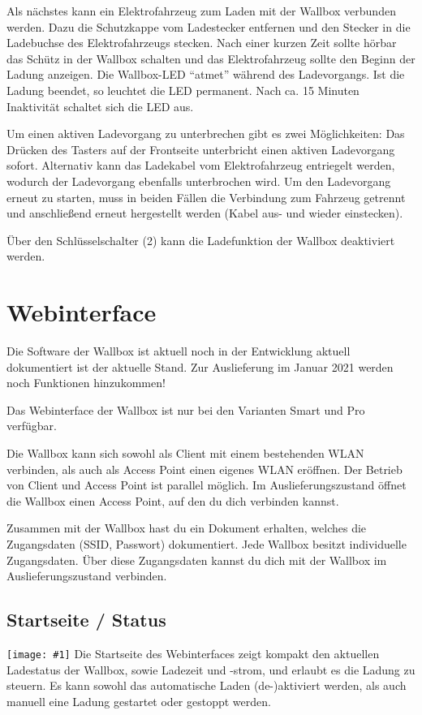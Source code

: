 \documentclass[a4paper,10pt]{article}
\newcommand{\hint}[1]{\begin{tcolorbox}[colback=boxgray,colframe=black,coltext=
white,title=Hinweis]#1\end{tcolorbox}}
\newcommand{\gfx}[1]{\texttt{[image: \#1]}}
\begin{document}
\begin{multicols*}{2}
	Als nächstes kann ein Elektrofahrzeug zum Laden mit der Wallbox verbunden
	werden. Dazu die Schutzkappe vom Ladestecker entfernen und den Stecker in die
	Ladebuchse des Elektrofahrzeugs stecken. Nach einer kurzen Zeit sollte hörbar
	das Schütz in der Wallbox schalten und das Elektrofahrzeug sollte den Beginn
	der Ladung anzeigen. Die Wallbox-LED \enquote{atmet} während des
	Ladevorgangs. Ist die Ladung beendet, so leuchtet die LED permanent. Nach ca.
	15 Minuten Inaktivität schaltet sich die LED aus.

	Um einen aktiven Ladevorgang zu unterbrechen gibt es zwei Möglichkeiten: Das
	Drücken des Tasters auf der Frontseite unterbricht einen aktiven Ladevorgang
	sofort. Alternativ kann das Ladekabel vom Elektrofahrzeug entriegelt werden,
	wodurch der Ladevorgang ebenfalls unterbrochen wird. Um den Ladevorgang erneut
	zu starten, muss in beiden Fällen die Verbindung zum Fahrzeug getrennt und
	anschließend erneut hergestellt werden (Kabel aus- und wieder einstecken).

	Über den Schlüsselschalter (2) kann die Ladefunktion der Wallbox deaktiviert
	werden.

	\section{Webinterface}
	\hint{Die Software der Wallbox ist aktuell noch in der Entwicklung aktuell
		dokumentiert ist der aktuelle Stand. Zur Auslieferung im Januar 2021 werden
		noch Funktionen hinzukommen!}
	Das Webinterface der Wallbox ist nur bei den Varianten Smart und Pro verfügbar.

	Die Wallbox kann sich sowohl als Client mit einem bestehenden WLAN verbinden,
	als auch als Access Point einen eigenes WLAN eröffnen. Der Betrieb von Client
	und Access Point ist parallel möglich. Im Auslieferungszustand öffnet die
	Wallbox einen Access Point, auf den du dich verbinden kannst.

	Zusammen mit der Wallbox hast du ein Dokument erhalten, welches die
	Zugangsdaten (SSID, Passwort) dokumentiert. Jede Wallbox besitzt individuelle
	Zugangsdaten.  Über diese Zugangsdaten kannst du dich mit der Wallbox im
	Auslieferungszustand verbinden.

	\subsection{Startseite / Status}
	\gfx{./img/resized/web_status}
	Die Startseite des Webinterfaces zeigt kompakt den aktuellen Ladestatus der 
	Wallbox, sowie Ladezeit und -strom, und erlaubt es die Ladung zu steuern. 
	Es kann sowohl das automatische Laden (de-)aktiviert werden, als auch 
	manuell eine Ladung gestartet oder gestoppt werden.


\end{multicols*}
\end{document}
